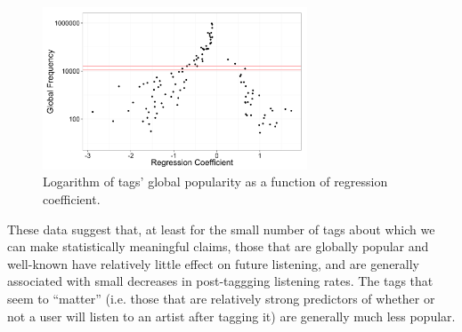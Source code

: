   \begin{figure}
	\centering
      \includegraphics[width=0.7\textwidth]{scatterplotTagRegression.png}
    \caption{Logarithm of tags' global popularity as a function of regression coefficient.}
    \label{fig:coefVsPopularity}
  \end{figure}

These data suggest that, at least for the small number of tags about which we can make statistically meaningful claims, those that are globally popular and well-known have relatively little effect on future listening, and are generally associated with small decreases in post-taggging listening rates. The tags that seem to ``matter'' (i.e. those that are relatively strong predictors of whether or not a user will listen to an artist after tagging it) are generally much less popular.